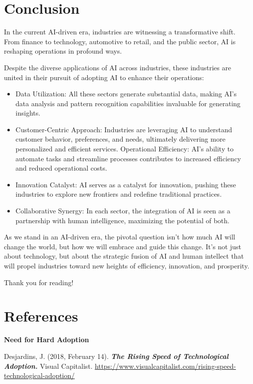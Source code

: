 \documentclass[
]{article}
\providecommand{\tightlist}{%
  \setlength{\itemsep}{0pt}\setlength{\parskip}{0pt}}
\begin{document}
\hypertarget{conclusion}{%
\section{Conclusion}\label{conclusion}}

In the current AI-driven era, industries are witnessing a transformative shift. From finance to technology, automotive to retail, and the public sector, AI is reshaping operations in profound ways.

Despite the diverse applications of AI across industries, these industries are united in their pursuit of adopting AI to enhance their operations:

\begin{itemize}
\tightlist
\item
  Data Utilization: All these sectors generate substantial data, making AI's data analysis and pattern recognition capabilities invaluable for generating insights.
\item
  Customer-Centric Approach: Industries are leveraging AI to understand customer behavior, preferences, and needs, ultimately delivering more personalized and efficient services.
  Operational Efficiency: AI's ability to automate tasks and streamline processes contributes to increased efficiency and reduced operational costs.
\item
  Innovation Catalyst: AI serves as a catalyst for innovation, pushing these industries to explore new frontiers and redefine traditional practices.
\item
  Collaborative Synergy: In each sector, the integration of AI is seen as a partnership with human intelligence, maximizing the potential of both.
\end{itemize}

As we stand in an AI-driven era, the pivotal question isn't how much AI will change the world, but how we will embrace and guide this change. It's not just about technology, but about the strategic fusion of AI and human intellect that will propel industries toward new heights of efficiency, innovation, and prosperity.

Thank you for reading!

\hypertarget{references}{%
\section{References}\label{references}}

\textbf{Need for Hard Adoption}

Desjardins, J. (2018, February 14). \textbf{\emph{The Rising Speed of Technological Adoption.}} Visual Capitalist. \url{https://www.visualcapitalist.com/rising-speed-technological-adoption/}
\end{document}
